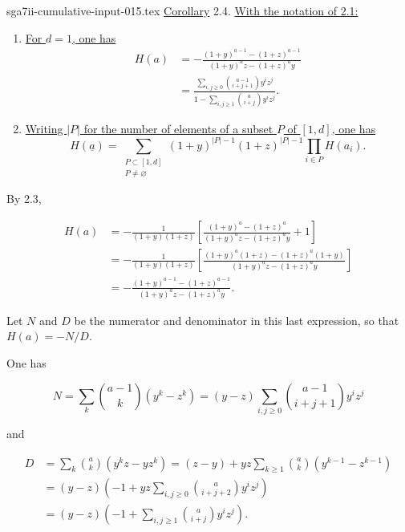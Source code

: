 \begin{filecontents*}{sga7ii-cumulative-input-015.tex}
\underline{Corollary} 2.4. \underline{With the notation of 2.1:}

\begin{enumerate}[label=(\roman*),leftmargin=2.6em]
\item \underline{For $d=1$, one has}
\begin{equation*}
\begin{aligned}
H(a)
&=-\frac{(1+y)^{a-1}-(1+z)^{a-1}}
{(1+y)^az-(1+z)^ay}\\[1ex]
&=\frac{\displaystyle\sum_{i,j\geq0}
\binom{a-1}{i+j+1}y^iz^j}
{\displaystyle1-\sum_{i,j\geq1}\binom{a}{i+j}y^iz^j}.
\end{aligned}
\end{equation*}

\item \underline{Writing $|P|$ for the number of elements of a subset
$P$ of $[1,d]$, one has}
\begin{equation*}
H(\underline a)=
\sum_{\substack{P\subset[1,d]\\P\ne\varnothing}}
(1+y)^{|P|-1}(1+z)^{|P|-1}
\prod_{i\in P}H(a_i).
\end{equation*}
\end{enumerate}

By 2.3,

\begin{align*}
H(a)
&=-\frac{1}{(1+y)(1+z)}\left[
\frac{(1+y)^a-(1+z)^a}{(1+y)^az-(1+z)^ay}+1\right]\\
&=-\frac{1}{(1+y)(1+z)}\left[
\frac{(1+y)^a(1+z)-(1+z)^a(1+y)}
{(1+y)^az-(1+z)^ay}\right]\\
&=-\frac{(1+y)^{a-1}-(1+z)^{a-1}}
{(1+y)^az-(1+z)^ay}.
\end{align*}

Let $N$ and $D$ be the numerator and denominator in this last expression,
so that $H(a)=-N/D$.


One has

\begin{equation*}
N=\sum_k\binom{a-1}{k}(y^k-z^k)
=(y-z)\sum_{i,j\geq0}\binom{a-1}{i+j+1}y^iz^j
\end{equation*}

and

\begin{align*}
D
&=\sum_k\binom ak(y^kz-yz^k)
=(z-y)+yz\sum_{k\geq1}\binom ak(y^{k-1}-z^{k-1})\\
&=(y-z)\left(-1+yz\sum_{i,j\geq0}
\binom a{i+j+2}y^iz^j\right)\\
&=(y-z)\left(-1+\sum_{i,j\geq1}
\binom a{i+j}y^iz^j\right).
\end{align*}


\end{filecontents*}

